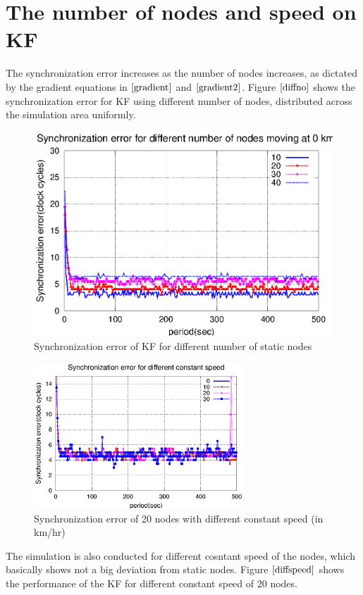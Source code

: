\documentclass[a4paper,10pt]{report}
\begin{document}
\section{\textbf{The number of nodes and speed on KF}}
The synchronization error increases as the number of nodes increases, as dictated by the gradient equations in $\cite{gradient}$ and $\cite{gradient2}$. Figure $\ref{diffno}$ shows the synchronization error for KF using different number of nodes, distributed across the simulation area uniformly.
\begin{figure}[!h]
\centering
\includegraphics[width= 0.7 \textwidth]{diffno}
\caption{Synchronization error of KF for different number of static nodes}
\label{diffno}
\end{figure}
\begin{figure}[!h]
\centering
\includegraphics[width = 0.7\textwidth]{diffspeed}
\caption{Synchronization error of 20 nodes with different constant speed (in km/hr)}
\label{diffspeed}
\end{figure}
The simulation is also conducted for different cosntant speed of the nodes, which basically shows not a big deviation from static nodes. Figure $\ref{diffspeed}$ shows the performance of the KF for different constant speed of 20 nodes.
\end{document}
